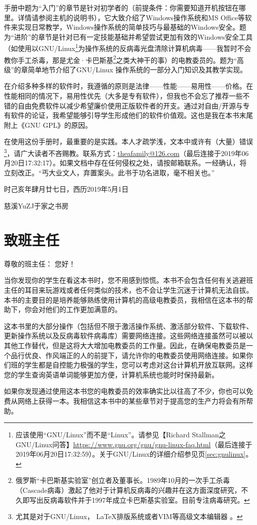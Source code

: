 手册中题为“入门”的章节是针对初学者的（前提条件：你需要知道开机按钮在哪里。详情请参阅主机的说明书），它大致介绍了Windows操作系统和MS Office等软件来实现日常教学，Windows操作系统的简单技巧与最基础的Windows安全。题为“进阶”的章节是针对已有一定技能基础并希望尝试更加有效的Windows安全工具（如使用以GNU/Linux\footnote{应该使用“GNU/Linux”而不是“Linux”。请参见【Richard Stallman之GNU/Linux问答】\url{https://www.gnu.org/gnu/gnu-linux-faq.html}（最后连接于2019年06月20日17:32:59）。关于GNU/Linux的详细介绍参见\pageref{sec:gnulinux}页\ref{sec:gnulinux}。}为操作系统的反病毒光盘清除计算机病毒——我暂时不会教你手工杀毒，那是尤金·卡巴斯基\footnote{俄罗斯“卡巴斯基实验室”创立者及董事长。1989年10月的一次手工杀毒（Cascade病毒）激起了他对于计算机反病毒的兴趣并在这方面深度研究，不久即写出反病毒软件并于1997年成立卡巴斯基实验室。目前专注病毒研究。}之类大神干的事）的电教委员的。题为“高级”的章简单地节介绍了GNU/Linux 操作系统的一部分入门知识及其教学实现。\par
在介绍多种多样的软件时，我遵循的原则是法律——性能——易用性——价格。在性能相同的情况下，易用性优先（大多是专有软件），但我也不会忘了推荐一些不错的自由免费软件以减少希望廉价使用正版软件者的开支。通过对自由/开源与专有软件的论证，我希望能够引导学生形成他们的软件价值观。这也是我在本书末尾附上《GNU GPL》的原因。\par
 在使用这份手册时，最重要的是实践。本人才疏学浅，文本中或许有（大量）错误\footnote{尤其是对于GNU/Linux， \LaTeX 排版系统或者VIM等高级文本编辑器 。}，请广大读者不吝赐教。联系方式：\url{theafamily@126.com}（最后连接于2019年06月20日17:32:17）。如果文档中存在任何侵权之处，请按邮箱联系。一经确认，将立刻改正。“丐大业文人，弃置案头。此书于功名进取，毫不相关也。”\par
时己亥年肆月廿七日，西历2019年5月1日\par
慈溪YuZJ于家之书房
\section{致班主任}
\noindent 尊敬的班主任：
您好！\par
当你发现你的学生在看这本书时，您不用感到惊慌。本书不会包含任何有关逃避班主任的耳目来玩游戏或者任何类似的技术，也不会让学生沉迷于计算机无法自拔。本书的主要目的是培养能够熟练使用计算机的高级电教委员，我相信在这本书的帮助下，你会对他们的工作更加满意的。\par
这本书里的大部分操作（包括但不限于激活操作系统、激活部分软件、下载软件、更新操作系统以及反病毒软件病毒库）需要网络连接。这些网络连接虽然可以被以其他工作替代，但是这将大大增加电教委员的工作量。因此，在确保电教委员是一个品行优良、作风端正的人的前提下，请允许你的电教委员使用网络连接。如果你们班的学生都是自控能力极强的学生，您可以考虑对这台计算机开放互联网。这样您的学生查询英语单词能够更加方便，计算机系统也能时时保持最新。\par
如果你发现通过使用这本书您的电教委员的效率确实比以往高了不少，你也可以免费从网络上获得一本。我相信这本书中的某些章节对于提高您的生产力将会有所帮助。
